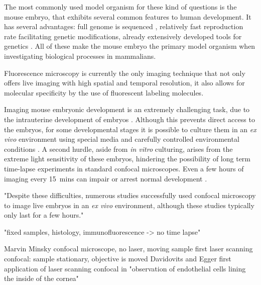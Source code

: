 The most commonly used model organism for these kind of questions is the mouse embryo, that exhibits several common features to human development.
It has several advantages: full genome is sequenced \cite{mouse_genome_sequencing_consortium_initial_2002}, relatively fast reproduction rate facilitating genetic modifications, already extensively developed tools for genetics \cite{capecchi_new_1989,silver_mouse_1995}. All of these make the mouse embryo the primary model organism when investigating biological processes in mammalians.

Fluorescence microscopy is currently the only imaging technique that not only offers live imaging with high spatial and temporal resolution, it also allows for molecular specificity by the use of fluorescent labeling molecules.

Imaging mouse embryonic development is an extremely challenging task, due to the intrauterine development of embryos \cite{wolpert_principles_2011}. Although this prevents direct access to the embryos, for some developmental stages it is possible to culture them in an \textit{ex vivo} environment using special media and carefully controlled environmental conditions \cite{garcia_live_2011,doherty_culture_2000}. A second hurdle, aside from \textit{in vitro} culturing, arises from the extreme light sensitivity \cite{nowotschin_chapter_2010} of these embryos, hindering the possibility of long term time-lapse experiments in standard confocal microscopes. Even a few hours of imaging every \SI{15}{mins} can impair or arrest normal development \cite{strnad_inverted_2016}.



"Despite these difficulties, numerous studies successfully used confocal microscopy to \cite{minsky_microscopy_1961} image live embryos in an \textit{ex vivo} environment, although these studies typically only last for a few hours."

"fixed samples, histology, immunofluorescence -> no time lapse"


Marvin Minsky confocal microscope, no laser, moving sample \cite{minsky_microscopy_1961}
first laser scanning confocal: sample stationary, objective is moved Davidovits and Egger 
first application of laser scanning confocal in "observation of endothelial cells lining the inside of the cornea" \cite{davidovits_photomicrography_1973}


